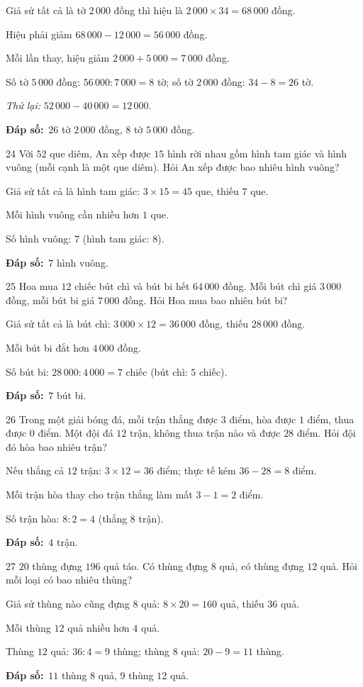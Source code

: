 \documentclass[11pt]{article}
\newif\ifsol \solfalse
\providecommand{\AnsWord}{Đáp số}
\newcommand{\dapso}[1]{\par\textbf{\AnsWord:}\ #1}
\newcommand{\probsol}[1]{%
  \begin{lrbox}{\solmeasure}\begin{minipage}{\dimexpr\linewidth-24pt\relax}#1\end{minipage}\end{lrbox}%
  \ifsol
    \begin{solbox}#1\end{solbox}%
  \else
    \setlength{\solht}{\dimexpr\ht\solmeasure+\dp\solmeasure+0.85cm\relax}%
    \ifdim\solht<1.35cm\setlength{\solht}{1.35cm}\fi
    \begin{tcolorbox}[colback=white,colframe=Line,boxrule=0.8pt,arc=5pt,
      left=8pt,right=8pt,top=4pt,bottom=4pt,height=\solht]{\footnotesize\color{Slate}\itshape\WorkWord}\end{tcolorbox}%
  \fi}
\newcommand{\gap}{\vspace{0.3cm}}
\def\WorkWord{Bài làm:}
\def\AnsWord{Đáp số}
\begin{document}
\probsol{
Giả sử tất cả là tờ $2\,000$ đồng thì hiệu là $2\,000\times34=68\,000$ đồng.\par
Hiệu phải giảm $68\,000-12\,000=56\,000$ đồng.\par
Mỗi lần thay, hiệu giảm $2\,000+5\,000=7\,000$ đồng.\par
Số tờ $5\,000$ đồng: $56\,000:7\,000=8$ tờ; số tờ $2\,000$ đồng: $34-8=26$ tờ.\par \emph{Thử lại:} $52\,000-40\,000=12\,000$.
\dapso{$26$ tờ $2\,000$ đồng, $8$ tờ $5\,000$ đồng.}}
\gap
\begin{probbox}{24}{\relax}
Với $52$ que diêm, An xếp được $15$ hình rời nhau gồm hình tam giác và hình vuông (mỗi cạnh là một que diêm). Hỏi An xếp được bao nhiêu hình vuông?
\end{probbox}
\probsol{
Giả sử tất cả là hình tam giác: $3\times15=45$ que, thiếu $7$ que.\par
Mỗi hình vuông cần nhiều hơn $1$ que.\par Số hình vuông: $7$ (hình tam giác: $8$).
\dapso{$7$ hình vuông.}}
\gap
\begin{probbox}{25}{\relax}
Hoa mua $12$ chiếc bút chì và bút bi hết $64\,000$ đồng. Mỗi bút chì giá $3\,000$ đồng, mỗi bút bi giá $7\,000$ đồng. Hỏi Hoa mua bao nhiêu bút bi?
\end{probbox}
\probsol{
Giả sử tất cả là bút chì: $3\,000\times12=36\,000$ đồng, thiếu $28\,000$ đồng.\par
Mỗi bút bi đắt hơn $4\,000$ đồng.\par Số bút bi: $28\,000:4\,000=7$ chiếc (bút chì: $5$ chiếc).
\dapso{$7$ bút bi.}}
\gap
\begin{probbox}{26}{\relax}
Trong một giải bóng đá, mỗi trận thắng được $3$ điểm, hòa được $1$ điểm, thua được $0$ điểm. Một đội đá $12$ trận, không thua trận nào và được $28$ điểm. Hỏi đội đó hòa bao nhiêu trận?
\end{probbox}
\probsol{
Nếu thắng cả $12$ trận: $3\times12=36$ điểm; thực tế kém $36-28=8$ điểm.\par
Mỗi trận hòa thay cho trận thắng làm mất $3-1=2$ điểm.\par Số trận hòa: $8:2=4$ (thắng $8$ trận).
\dapso{$4$ trận.}}
\gap
\begin{probbox}{27}{\relax}
$20$ thùng đựng $196$ quả táo. Có thùng đựng $8$ quả, có thùng đựng $12$ quả. Hỏi mỗi loại có bao nhiêu thùng?
\end{probbox}
\probsol{
Giả sử thùng nào cũng đựng $8$ quả: $8\times20=160$ quả, thiếu $36$ quả.\par
Mỗi thùng $12$ quả nhiều hơn $4$ quả.\par Thùng $12$ quả: $36:4=9$ thùng; thùng $8$ quả: $20-9=11$ thùng.
\dapso{$11$ thùng $8$ quả, $9$ thùng $12$ quả.}}
\end{document}

